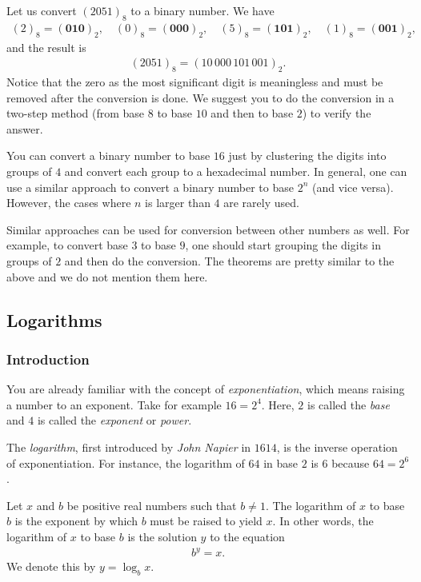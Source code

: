 \documentclass{subfile}
\begin{document}
	\begin{example}
		Let us convert $(2051)_8$ to a binary number. We have
		\begin{align*}
			(2)_8=(\textbf{010})_2, \quad (0)_8=(\textbf{000})_2, \quad (5)_8=(\textbf{101})_2, \quad (1)_8=(\textbf{001})_2,
		\end{align*}
		and the result is
		\begin{align*}
			(2051)_8 = (10\,000\,101\,001)_2.
		\end{align*}
		Notice that the zero as the most significant digit is meaningless and must be removed after the conversion is done. We suggest you to do the conversion in a two-step method (from base $8$ to base $10$ and then to base $2$) to verify the answer.
	\end{example}
	You can convert a binary number to base $16$ just by clustering the digits into groups of $4$ and convert each group to a hexadecimal number. In general, one can use a similar approach to convert a binary number to base $2^n$ (and vice versa). However, the cases where $n$ is larger than $4$ are rarely used.

	Similar approaches can be used for conversion between other numbers as well. For example, to convert base $3$ to base $9$, one should start grouping the digits in groups of $2$ and then do the conversion. The theorems are pretty similar to the above and we do not mention them here.

\subsection{Logarithms}\label{sec:logarithm}
	\subsubsection{Introduction}
	You are already familiar with the concept of \textit{exponentiation}, which means raising a number to an exponent. Take for example $16=2^4$. Here, $2$ is called the \textit{base} and $4$ is called the \textit{exponent} or \textit{power}.

	The \textit{logarithm}, first introduced by \textit{John Napier} in $1614$, is the inverse operation of exponentiation. For instance, the logarithm of $64$ in base $2$ is $6$ because $64=2^6$.

	\begin{definition}
		Let $x$ and $b$ be positive real numbers such that $b \neq 1$. The logarithm of $x$ to base $b$ is the exponent by which $b$ must be raised to yield $x$.  In other words, the logarithm of $x$ to base $b$ is the solution $y$ to the equation
		\begin{align*}
			b^y = x.
		\end{align*}
		We denote this by $y = \log_b x$.
	\end{definition}
\end{document}
